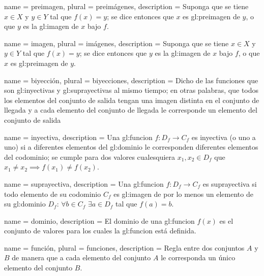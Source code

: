 {
  name = preimagen,
  plural = preimágenes,
  description = {
    Suponga que se tiene $x \in X$ y $y \in Y$ tal que $f(x) = y$;
    se dice entonces que $x$ es \gls{gl:preimagen} de $y$, o que
    $y$ es la \gls{gl:imagen} de $x$ bajo $f$.
  }
}

{
  name = imagen,
  plural = imágenes,
  description = {
    Suponga que se tiene $x \in X$ y $y \in Y$ tal que $f(x) = y$;
    se dice entonces que $y$ es la \gls{gl:imagen} de $x$ bajo $f$,
    o que $x$ es \gls{gl:preimagen} de $y$.
  }
}

{
  name = biyección,
  plural = biyecciones,
  description = {
    Dicho de las funciones que son \glspl{gl:inyectiva} y
    \glspl{gl:suprayectiva} al mismo tiempo; en otras palabras, que todos los
    elementos del conjunto de salida tengan una imagen distinta en el conjunto
    de llegada y a cada elemento del conjunto de llegada le corresponde
    un elemento del conjunto de salida%
  }
}

{
  name = inyectiva,
  description = {
    Una \gls{gl:funcion} $f:D_f \rightarrow C_f$ es inyectiva (o uno a
    uno) si a diferentes elementos del \gls{gl:dominio} le corresponden
    diferentes elementos del codominio; se cumple para dos
    valores cualesquiera $x_1, x_2 \in D_f$ que
    $x_1 \neq x_2 \implies f(x_1) \neq f(x_2)$.
  }
}

{
  name = suprayectiva,
  description = {
    Una \gls{gl:funcion} $f:D_f \rightarrow C_f$ es suprayectiva si
    todo elemento de su codominio $C_f$ es \gls{gl:imagen} de
    por lo menos un elemento de su \gls{gl:dominio} $D_f$: $\forall b \in C_f$
    $\exists a \in D_f$ tal que $f(a)=b$.
  }
}

{
  name = dominio,
  description = {
    El dominio de una \gls{gl:funcion} $f(x)$ es el conjunto de valores
    para los cuales la \gls{gl:funcion} está definida.
  }
}

{
  name = función,
  plural = funciones,
  description = {
    Regla entre dos conjuntos $A$ y $B$ de manera que a cada elemento del
    conjunto $A$ le corresponda un único elemento del conjunto $B$.
  }
}

\glsaddall
